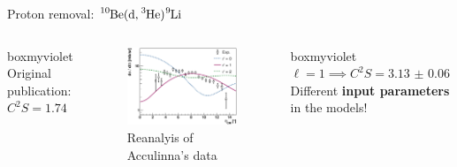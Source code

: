 \documentclass[sans,
frameno, %
mp,
usenames,dvipsnames, %
onlytextwidth, %
t,%
11pt]{beamer}
\newcommand{\iso}[2]{\ce{^{#1}#2}}
\begin{document}
\begin{frame}{Proton removal: $\iso{10}{Be}(\textrm{d}, \iso{3}{He})\iso{9}{Li}$}
\begin{columns}[t]
{{                \medskip
                \hfill
                \begin{beamercolorbox}[sep=1ex,center, rounded=true, wd=0.95\linewidth]{boxmyviolet}
                    Original publication:\\
                    $C^2S = \qty{1.74}{}$
                \end{beamercolorbox}
                \hfill
            }
            {
                \begin{figure}
                    \centering
                    \captionsetup{belowskip=-8pt}
                    \caption{Reanalyis of Acculinna's data}
                    \includegraphics[width=\linewidth, cfbox=Mulberry 1pt 0pt 0pt]{figures/acculina.eps}%
                \end{figure}

                \medskip
                \hfill
                \begin{beamercolorbox}[sep=1ex,center, rounded=true, wd=0.95\linewidth]{boxmyviolet}
                    $\ell = 1 \implies C^2S = \qty{3.13(6)}{}$\\
                    Different \textbf{input parameters} in the models!
                \end{beamercolorbox}
                \hfill
            }
        }
    \end{columns}
\end{frame}
\end{document}
